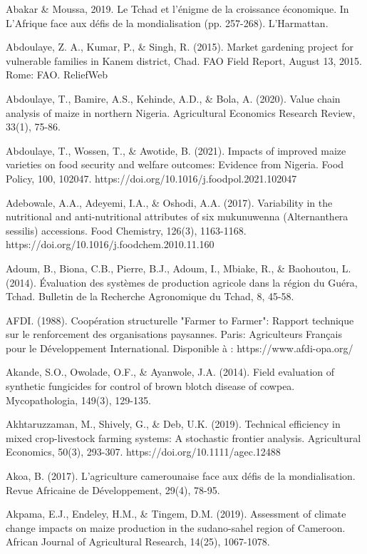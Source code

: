 \documentclass[12pt,oneside]{report}
\begin{document}
Abakar \& Moussa, 2019. Le Tchad et l'énigme de la croissance économique. In L'Afrique face aux défis de la mondialisation (pp. 257-268). L'Harmattan.

Abdoulaye, Z. A., Kumar, P., \& Singh, R. (2015). Market gardening project for vulnerable families in Kanem district, Chad. FAO Field Report, August 13, 2015. Rome: FAO. ReliefWeb

Abdoulaye, T., Bamire, A.S., Kehinde, A.D., \& Bola, A. (2020). Value chain analysis of maize in northern Nigeria. Agricultural Economics Research Review, 33(1), 75-86.

Abdoulaye, T., Wossen, T., \& Awotide, B. (2021). Impacts of improved maize varieties on food security and welfare outcomes: Evidence from Nigeria. Food Policy, 100, 102047. https://doi.org/10.1016/j.foodpol.2021.102047

Adebowale, A.A., Adeyemi, I.A., \& Oshodi, A.A. (2017). Variability in the nutritional and anti-nutritional attributes of six mukunuwenna (Alternanthera sessilis) accessions. Food Chemistry, 126(3), 1163-1168. https://doi.org/10.1016/j.foodchem.2010.11.160

Adoum, B., Biona, C.B., Pierre, B.J., Adoum, I., Mbiake, R., \& Baohoutou, L. (2014). Évaluation des systèmes de production agricole dans la région du Guéra, Tchad. Bulletin de la Recherche Agronomique du Tchad, 8, 45-58.

AFDI. (1988). Coopération structurelle "Farmer to Farmer": Rapport technique sur le renforcement des organisations paysannes. Paris: Agriculteurs Français pour le Développement International. Disponible à : https://www.afdi-opa.org/

Akande, S.O., Owolade, O.F., \& Ayanwole, J.A. (2014). Field evaluation of synthetic fungicides for control of brown blotch disease of cowpea. Mycopathologia, 149(3), 129-135.

Akhtaruzzaman, M., Shively, G., \& Deb, U.K. (2019). Technical efficiency in mixed crop-livestock farming systems: A stochastic frontier analysis. Agricultural Economics, 50(3), 293-307. https://doi.org/10.1111/agec.12488

Akoa, B. (2017). L'agriculture camerounaise face aux défis de la mondialisation. Revue Africaine de Développement, 29(4), 78-95.

Akpama, E.J., Endeley, H.M., \& Tingem, D.M. (2019). Assessment of climate change impacts on maize production in the sudano-sahel region of Cameroon. African Journal of Agricultural Research, 14(25), 1067-1078.
\end{document}
